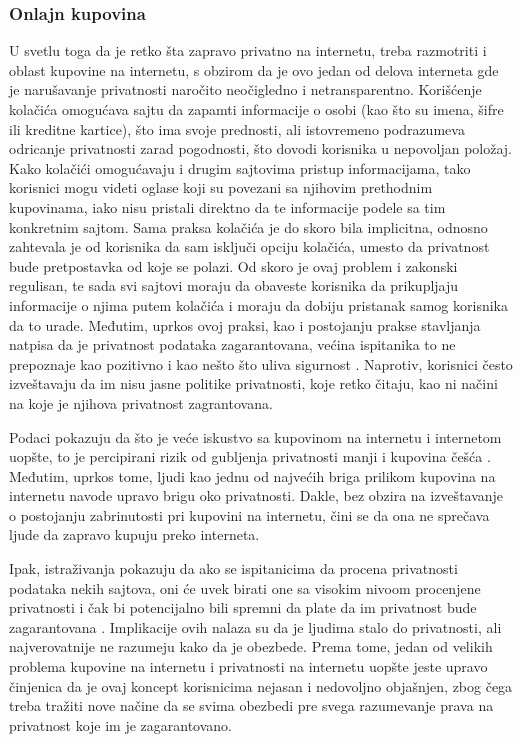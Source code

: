 \documentclass[a4paper]{article}
\begin{document}
\subsubsection{Onlajn kupovina} 
U svetlu toga da je retko šta zapravo privatno na internetu, treba razmotriti i oblast kupovine na internetu, s obzirom da je ovo jedan od delova interneta gde je narušavanje privatnosti naročito neočigledno i netransparentno. Korišćenje kolačića omogućava sajtu da zapamti informacije o osobi (kao što su imena, šifre ili kreditne kartice), što ima svoje prednosti, ali istovremeno podrazumeva odricanje privatnosti zarad pogodnosti, što dovodi korisnika u nepovoljan položaj. Kako kolačići omogućavaju i drugim sajtovima pristup informacijama, tako korisnici mogu videti oglase koji su povezani sa njihovim prethodnim kupovinama, iako nisu pristali direktno da te informacije podele sa tim konkretnim sajtom. Sama praksa kolačića je do skoro bila implicitna, odnosno zahtevala je od korisnika da sam isključi opciju kolačića, umesto da privatnost bude pretpostavka od koje se polazi. Od skoro je ovaj problem i zakonski regulisan, te sada svi sajtovi moraju da obaveste korisnika da prikupljaju informacije o njima putem kolačića i moraju da dobiju pristanak samog korisnika da to urade. Međutim, uprkos ovoj praksi, kao i postojanju prakse stavljanja natpisa da je privatnost podataka zagarantovana, većina ispitanika to ne prepoznaje kao pozitivno i kao nešto što uliva sigurnost \cite{cookies2}. Naprotiv, korisnici često izveštavaju da im nisu jasne politike privatnosti, koje retko čitaju, kao ni načini na koje je njihova privatnost zagrantovana.
\par Podaci pokazuju da što je veće iskustvo sa kupovinom na internetu i internetom uopšte, to je percipirani rizik od gubljenja privatnosti manji i kupovina češća \cite{cookies3}. Međutim, uprkos tome, ljudi kao jednu od najvećih briga prilikom kupovina na internetu navode upravo brigu oko privatnosti. Dakle, bez obzira na izveštavanje o postojanju zabrinutosti pri kupovini na internetu, čini se da ona ne sprečava ljude da zapravo kupuju preko interneta.
\par Ipak, istraživanja pokazuju da ako se ispitanicima da procena privatnosti podataka nekih sajtova, oni će uvek birati one sa visokim nivoom procenjene privatnosti i čak bi potencijalno bili spremni da plate da im privatnost bude zagarantovana \cite{cookies2}. Implikacije ovih nalaza su da je ljudima stalo do privatnosti, ali najverovatnije ne razumeju kako da je obezbede. Prema tome, jedan od velikih problema kupovine na internetu i privatnosti na internetu uopšte jeste upravo činjenica da je ovaj koncept korisnicima nejasan i nedovoljno objašnjen, zbog čega treba tražiti nove načine da se svima obezbedi pre svega razumevanje prava na privatnost koje im je zagarantovano.
\end{document}
